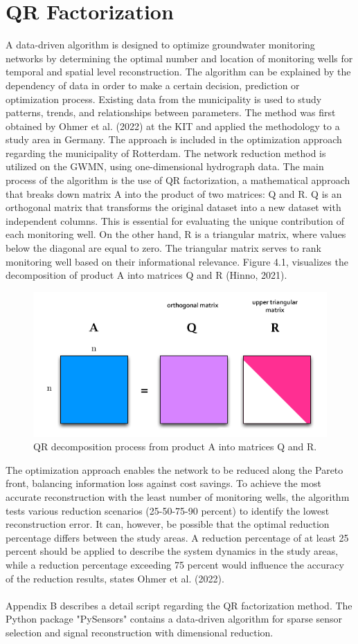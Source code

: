 \section{QR Factorization}
A data-driven algorithm is designed to optimize groundwater monitoring networks by determining the optimal number and location of monitoring wells for temporal and spatial level reconstruction. The algorithm can be explained by the dependency of data in order to make a certain decision, prediction or optimization process. Existing data from the municipality is used to study patterns, trends, and relationships between parameters. The method was first obtained by Ohmer et al. (2022) at the KIT and applied the methodology to a study area in Germany. The approach is included in the optimization approach regarding the municipality of Rotterdam. The network reduction method is utilized on the GWMN, using one-dimensional hydrograph data. The main process of the algorithm is the use of QR factorization, a mathematical approach that breaks down matrix A into the product of two matrices: Q and R. Q is an orthogonal matrix that transforms the original dataset into a new dataset with independent columns. This is essential for evaluating the unique contribution of each monitoring well. On the other hand, R is a triangular matrix, where values below the diagonal are equal to zero. The triangular matrix serves to rank monitoring well based on their informational relevance. Figure 4.1, visualizes the decomposition of product A into matrices Q and R (Hinno, 2021).

\begin{figure}[htbp]
    \centering
    \includegraphics[width=0.40\linewidth]{figures/figures theory/qr rank.png}
    \caption{QR decomposition process from product A into matrices Q and R.}
\end{figure}
The optimization approach enables the network to be reduced along the Pareto front, balancing information loss against cost savings. To achieve the most accurate reconstruction with the least number of monitoring wells, the algorithm tests various reduction scenarios (25-50-75-90 percent) to identify the lowest reconstruction error. It can, however, be possible that the optimal reduction percentage differs between the study areas. A reduction percentage of at least 25 percent should be applied to describe the system dynamics in the study areas, while a reduction percentage exceeding 75 percent would influence the accuracy of the reduction results, states Ohmer et al. (2022). \\
\\
Appendix B describes a detail script regarding the QR factorization method. The Python package "PySensors" contains a data-driven algorithm for sparse sensor selection and signal reconstruction with dimensional reduction.





